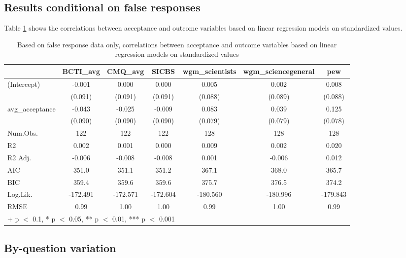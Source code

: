 \documentclass[
  doc,floatsintext]{apa6}
\begin{document}
\subsection{Results conditional on false responses}\label{results-conditional-on-false-responses-2}

Table \ref{tab:exp3-false-response-regression} shows the correlations between acceptance and outcome variables based on linear regression models on standardized values.

\begin{table}

\caption{\label{tab:exp3-false-response-regression}Based on false response data only, correlations between acceptance and outcome variables based on linear regression models on standardized values}
\centering
\begin{tabular}[t]{lcccccc}
\toprule
  & BCTI\_avg & CMQ\_avg & SICBS & wgm\_scientists & wgm\_sciencegeneral & pew\\
\midrule
(Intercept) & -0.001 & 0.000 & 0.000 & 0.005 & 0.002 & 0.008\\
 & (0.091) & (0.091) & (0.091) & (0.088) & (0.089) & (0.088)\\
avg\_acceptance & -0.043 & -0.025 & -0.009 & 0.083 & 0.039 & 0.125\\
 & (0.090) & (0.090) & (0.090) & (0.079) & (0.079) & (0.078)\\
\midrule
Num.Obs. & 122 & 122 & 122 & 128 & 128 & 128\\
R2 & 0.002 & 0.001 & 0.000 & 0.009 & 0.002 & 0.020\\
R2 Adj. & -0.006 & -0.008 & -0.008 & 0.001 & -0.006 & 0.012\\
AIC & 351.0 & 351.1 & 351.2 & 367.1 & 368.0 & 365.7\\
BIC & 359.4 & 359.6 & 359.6 & 375.7 & 376.5 & 374.2\\
Log.Lik. & -172.491 & -172.571 & -172.604 & -180.560 & -180.996 & -179.843\\
RMSE & 0.99 & 1.00 & 1.00 & 0.99 & 1.00 & 0.99\\
\bottomrule
\multicolumn{7}{l}{\rule{0pt}{1em}+ p $<$ 0.1, * p $<$ 0.05, ** p $<$ 0.01, *** p $<$ 0.001}\\
\end{tabular}
\end{table}

\subsection{By-question variation}\label{by-question-variation-2}
\end{document}
